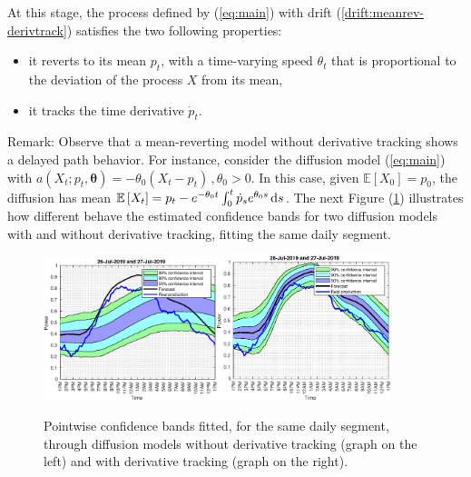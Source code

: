\documentclass[11pt]{article}
\theoremstyle{definition}
\begin{document}
 At this stage, the process defined by (\ref{eq:main}) with drift (\ref{drift:meanrev-derivtrack}) satisfies the two following properties: 
\begin{itemize}
\item it reverts to its mean $p_t$, with a time-varying speed $ \theta_t$ that is proportional to the deviation of the process $X$ from its mean,
\item it tracks the time derivative $\dot{p}_t$.  
\end{itemize} 

Remark: Observe that a mean-reverting model without derivative tracking shows a delayed path behavior. For instance, consider the diffusion model (\ref{eq:main}) with $a(X_t; p_t, \bm{\theta}) = - \theta_0 (X_t - p_t)\,, \theta_0 > 0$. In this case, given  $ \mathbb{E} \left[X_0\right] = p_0$, the diffusion has mean $\mathbb{E} \left[X_t\right] = p_t - e^{- \theta_0 t } \int_0^t \dot{p}_s  e^{\theta_0 s} \dif s$. The next Figure (\ref{fig:derivative_tracking}) illustrates how different behave the estimated confidence bands for two diffusion models with and without derivative tracking, fitting the same daily segment. 

\begin{figure}[H]
\centering
  \includegraphics[width=0.45\textwidth]{plots/31.eps}\includegraphics[width=0.45\textwidth]{plots/31_2.eps}
  \caption{Pointwise confidence bands fitted, for the same daily segment, through diffusion models without derivative tracking (graph on the left) and with derivative tracking (graph on the right).}
  \label{fig:derivative_tracking}
\end{figure}
\end{document}
